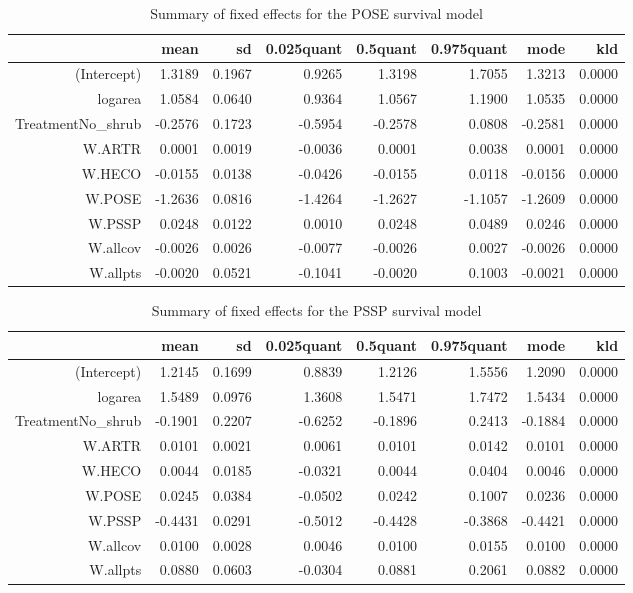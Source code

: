 \begin{table}[ht]
\centering
\caption{Summary of fixed effects for the POSE survival model} 
\label{POSEsurvival}
\begin{tabular}{rrrrrrrr}
  \hline
 & mean & sd & 0.025quant & 0.5quant & 0.975quant & mode & kld \\ 
  \hline
(Intercept) & 1.3189 & 0.1967 & 0.9265 & 1.3198 & 1.7055 & 1.3213 & 0.0000 \\ 
  logarea & 1.0584 & 0.0640 & 0.9364 & 1.0567 & 1.1900 & 1.0535 & 0.0000 \\ 
  TreatmentNo\_shrub & -0.2576 & 0.1723 & -0.5954 & -0.2578 & 0.0808 & -0.2581 & 0.0000 \\ 
  W.ARTR & 0.0001 & 0.0019 & -0.0036 & 0.0001 & 0.0038 & 0.0001 & 0.0000 \\ 
  W.HECO & -0.0155 & 0.0138 & -0.0426 & -0.0155 & 0.0118 & -0.0156 & 0.0000 \\ 
  W.POSE & -1.2636 & 0.0816 & -1.4264 & -1.2627 & -1.1057 & -1.2609 & 0.0000 \\ 
  W.PSSP & 0.0248 & 0.0122 & 0.0010 & 0.0248 & 0.0489 & 0.0246 & 0.0000 \\ 
  W.allcov & -0.0026 & 0.0026 & -0.0077 & -0.0026 & 0.0027 & -0.0026 & 0.0000 \\ 
  W.allpts & -0.0020 & 0.0521 & -0.1041 & -0.0020 & 0.1003 & -0.0021 & 0.0000 \\ 
   \hline
\end{tabular}
\end{table}

\begin{table}[ht]
\centering
\caption{Summary of fixed effects for the PSSP survival model} 
\label{PSSPsurvival}
\begin{tabular}{rrrrrrrr}
  \hline
 & mean & sd & 0.025quant & 0.5quant & 0.975quant & mode & kld \\ 
  \hline
(Intercept) & 1.2145 & 0.1699 & 0.8839 & 1.2126 & 1.5556 & 1.2090 & 0.0000 \\ 
  logarea & 1.5489 & 0.0976 & 1.3608 & 1.5471 & 1.7472 & 1.5434 & 0.0000 \\ 
  TreatmentNo\_shrub & -0.1901 & 0.2207 & -0.6252 & -0.1896 & 0.2413 & -0.1884 & 0.0000 \\ 
  W.ARTR & 0.0101 & 0.0021 & 0.0061 & 0.0101 & 0.0142 & 0.0101 & 0.0000 \\ 
  W.HECO & 0.0044 & 0.0185 & -0.0321 & 0.0044 & 0.0404 & 0.0046 & 0.0000 \\ 
  W.POSE & 0.0245 & 0.0384 & -0.0502 & 0.0242 & 0.1007 & 0.0236 & 0.0000 \\ 
  W.PSSP & -0.4431 & 0.0291 & -0.5012 & -0.4428 & -0.3868 & -0.4421 & 0.0000 \\ 
  W.allcov & 0.0100 & 0.0028 & 0.0046 & 0.0100 & 0.0155 & 0.0100 & 0.0000 \\ 
  W.allpts & 0.0880 & 0.0603 & -0.0304 & 0.0881 & 0.2061 & 0.0882 & 0.0000 \\ 
   \hline
\end{tabular}
\end{table}

